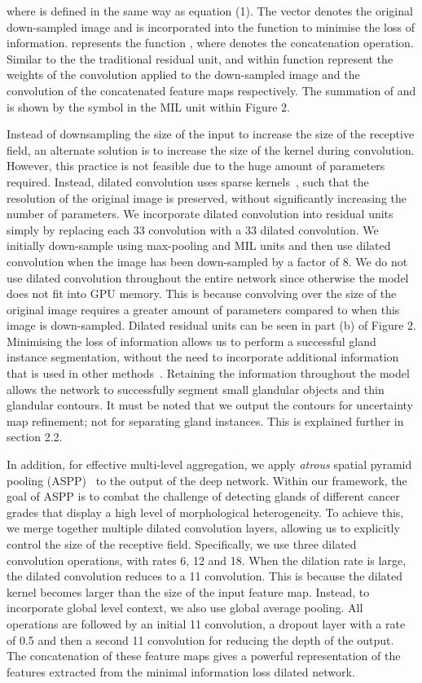 \documentclass[3p]{elsarticle}
\begin{document}
\noindent where  is defined in the same way as equation (1). The vector  denotes the original down-sampled image and is incorporated into the function  to minimise the loss of information.  represents the function  , where  denotes the concatenation operation. Similar to the the traditional residual unit,   and  within function  represent the weights of the convolution applied to the down-sampled image and the convolution of the concatenated feature maps respectively. The summation of  and  is shown by the   symbol in the MIL unit within Figure 2.

Instead of downsampling the size of the input to increase the size of the receptive field, an alternate solution is to increase the size of the kernel during convolution. However, this practice is not feasible due to the huge amount of parameters required. Instead, dilated convolution uses sparse kernels~\citep{yu2015multi}, such that the resolution of the original image is preserved, without significantly increasing the number of parameters. We incorporate dilated convolution into residual units simply by replacing each 33 convolution with a 33 dilated convolution. We initially down-sample using max-pooling and MIL units and then use dilated convolution when the image has been down-sampled by a factor of 8. We do not use dilated convolution throughout the entire network since otherwise the model does not fit into GPU memory. This is because convolving over the size of the original image requires a greater amount of parameters compared to when this image is down-sampled. Dilated residual units can be seen in part (b) of Figure 2. Minimising the loss of information allows us to perform a successful gland instance segmentation, without the need to incorporate additional information that is used in other methods~\citep{chen2017dcan}. Retaining the information throughout the model allows the network to successfully segment small glandular objects and thin glandular contours. It must be noted that we output the contours for uncertainty map refinement; not for separating gland instances. This is explained further in section 2.2. 

In addition, for effective multi-level aggregation, we apply \textit{atrous} spatial pyramid pooling (ASPP)~\citep{chen2018deeplab} to the output of the deep network. Within our framework, the goal of ASPP is to combat the challenge of detecting glands of different cancer grades that display a high level of morphological heterogeneity. To achieve this, we merge together multiple dilated convolution layers, allowing us to explicitly control the size of the receptive field. Specifically, we use three dilated convolution operations, with rates 6, 12 and 18. When the dilation rate is large, the dilated convolution reduces to a 11 convolution. This is because the dilated kernel becomes larger than the size of the input feature map. Instead, to incorporate global level context, we also use global average pooling. All operations are followed by an initial 11 convolution, a dropout layer with a rate of 0.5 and then a second 11 convolution for reducing the depth of the output. The concatenation of these feature maps gives a powerful representation of the features extracted from the minimal information loss dilated network.
\end{document}
